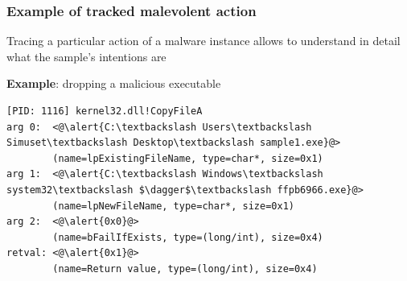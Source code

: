 \documentclass[compress]{beamer}
\begin{document}
\begin{frame}[fragile]
    \frametitle{Example of tracked malevolent action}

\begin{beamerboxesrounded}[shadow=true]{}
Tracing a particular action of a malware instance allows to understand in detail what the sample's intentions are
\end{beamerboxesrounded}
\bigskip    
\textbf{Example}: dropping a malicious executable
\vspace*{0.3cm}
    
	

\begin{lstlisting}
[PID: 1116] kernel32.dll!CopyFileA
arg 0:  <@\alert{C:\textbackslash Users\textbackslash Simuset\textbackslash Desktop\textbackslash sample1.exe}@> 
        (name=lpExistingFileName, type=char*, size=0x1)
arg 1:  <@\alert{C:\textbackslash Windows\textbackslash system32\textbackslash $\dagger$\textbackslash ffpb6966.exe}@> 
        (name=lpNewFileName, type=char*, size=0x1)
arg 2:  <@\alert{0x0}@> 
        (name=bFailIfExists, type=(long/int), size=0x4)
retval: <@\alert{0x1}@> 
        (name=Return value, type=(long/int), size=0x4)
\end{lstlisting}

\end{frame}
\end{document}
